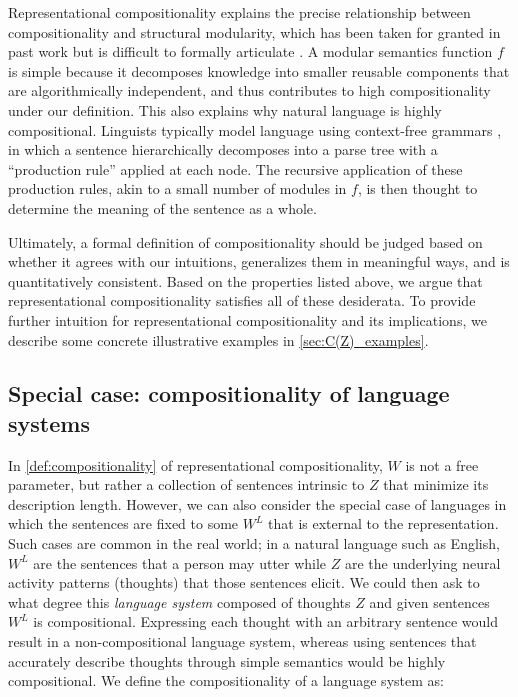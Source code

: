 \documentclass{article}
\newcommand{\comp}{representational compositionality}
\newcommand{\Comp}{Representational compositionality}
\begin{document}
\Comp{} explains the precise relationship between compositionality and structural modularity, which has been taken for granted in past work but is difficult to formally articulate \citep{lepori2023break,goyal2022inductive,mittal2022modular}. A modular semantics function $f$ is simple because it decomposes knowledge into smaller reusable components that are algorithmically independent, and thus contributes to high compositionality under our definition. This also explains why natural language is highly compositional. Linguists typically model language using context-free grammars \citep{chomsky1956three}, in which a sentence hierarchically decomposes into a parse tree with a ``production rule'' applied at each node. The recursive application of these production rules, akin to a small number of modules in $f$, is then thought to determine the meaning of the sentence as a whole.

Ultimately, a formal definition of compositionality should be judged based on whether it agrees with our intuitions, generalizes them in meaningful ways, and is quantitatively consistent. Based on the properties listed above, we argue that \comp{} satisfies all of these desiderata. To provide further intuition for \comp{} and its implications, we describe some concrete illustrative examples in \cref{sec:C(Z)_examples}.


\subsection{Special case: compositionality of language systems}
\label{sec:language_system}

In \cref{def:compositionality} of \comp{}, $W$ is not a free parameter, but rather a collection of sentences intrinsic to $Z$ that minimize its description length. However, we can also consider the special case of languages in which the sentences are fixed to some $W^L$ that is external to the representation. Such cases are common in the real world; in a natural language such as English, $W^L$ are the sentences that a person may utter while $Z$ are the underlying neural activity patterns (thoughts) that those sentences elicit. We could then ask to what degree this \textit{language system} composed of thoughts $Z$ and given sentences $W^L$ is compositional. Expressing each thought with an arbitrary sentence would result in a non-compositional language system, whereas using sentences that accurately describe thoughts through simple semantics would be highly compositional. We define the compositionality of a language system as:
\end{document}
